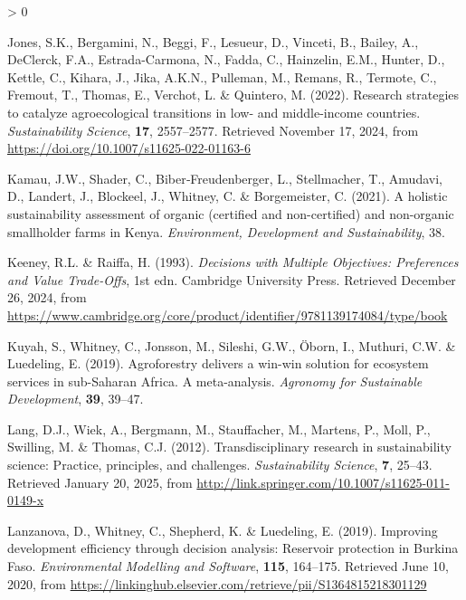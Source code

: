 \documentclass[
]{article}
\newlength{\cslhangindent}
\newenvironment{CSLReferences}[2] %
 {%
  \setlength{\parindent}{0pt}
  \ifodd #1 \everypar{\setlength{\hangindent}{\cslhangindent}}\ignorespaces\fi
  \ifnum #2 > 0
  \setlength{\parskip}{#2\baselineskip}
  \fi
 }%
 {}
\begin{document}
\begin{CSLReferences}{1}{0}
\leavevmode{}%
Jones, S.K., Bergamini, N., Beggi, F., Lesueur, D., Vinceti, B., Bailey,
A., DeClerck, F.A., Estrada-Carmona, N., Fadda, C., Hainzelin, E.M.,
Hunter, D., Kettle, C., Kihara, J., Jika, A.K.N., Pulleman, M., Remans,
R., Termote, C., Fremout, T., Thomas, E., Verchot, L. \& Quintero, M.
(2022). Research strategies to catalyze agroecological transitions in
low- and middle-income countries. \emph{Sustainability Science},
\textbf{17}, 2557--2577. Retrieved November 17, 2024, from
\url{https://doi.org/10.1007/s11625-022-01163-6}

\leavevmode{}%
Kamau, J.W., Shader, C., Biber‐Freudenberger, L., Stellmacher, T.,
Amudavi, D., Landert, J., Blockeel, J., Whitney, C. \& Borgemeister, C.
(2021). A holistic sustainability assessment of organic (certified and
non-certified) and non-organic smallholder farms in {Kenya}.
\emph{Environment, Development and Sustainability}, 38.

\leavevmode{}%
Keeney, R.L. \& Raiffa, H. (1993). \emph{Decisions with {Multiple}
{Objectives}: {Preferences} and {Value} {Trade}-{Offs}}, 1st edn.
Cambridge University Press. Retrieved December 26, 2024, from
\url{https://www.cambridge.org/core/product/identifier/9781139174084/type/book}

\leavevmode{}%
Kuyah, S., Whitney, C., Jonsson, M., Sileshi, G.W., Öborn, I., Muthuri,
C.W. \& Luedeling, E. (2019). Agroforestry delivers a win-win solution
for ecosystem services in sub-{Saharan} {Africa}. {A} meta-analysis.
\emph{Agronomy for Sustainable Development}, \textbf{39}, 39--47.

\leavevmode{}%
Lang, D.J., Wiek, A., Bergmann, M., Stauffacher, M., Martens, P., Moll,
P., Swilling, M. \& Thomas, C.J. (2012). Transdisciplinary research in
sustainability science: Practice, principles, and challenges.
\emph{Sustainability Science}, \textbf{7}, 25--43. Retrieved January 20,
2025, from \url{http://link.springer.com/10.1007/s11625-011-0149-x}

\leavevmode{}%
Lanzanova, D., Whitney, C., Shepherd, K. \& Luedeling, E. (2019).
Improving development efficiency through decision analysis: {Reservoir}
protection in {Burkina} {Faso}. \emph{Environmental Modelling and
Software}, \textbf{115}, 164--175. Retrieved June 10, 2020, from
\url{https://linkinghub.elsevier.com/retrieve/pii/S1364815218301129}


\end{CSLReferences}
\end{document}
